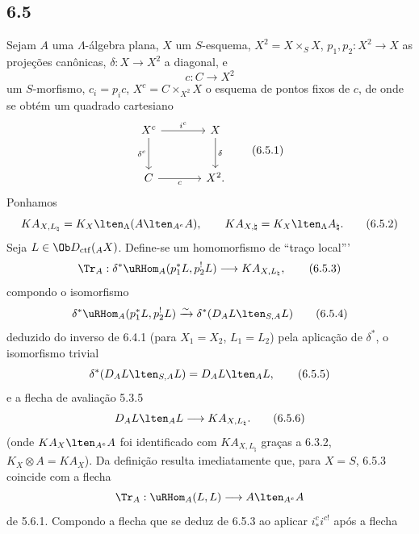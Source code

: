 \subsection*{6.5}
Sejam $A$ uma $\Lambda$-álgebra plana, $X$ um $S$-esquema, $X^2=X\times_SX$, $p_1,p_2:X^2\to X$ as projeções canônicas, $\delta:X\to X^2$ a diagonal, e
\[
c:C\longrightarrow X^2
\]
um $S$-morfismo, $c_i=p_ic$, $X^c=C\times_{X^2}X$ o esquema de pontos fixos de $c$, de onde se obtém um quadrado cartesiano
\begin{equation}
\begin{tikzcd}[column sep=large,row sep=large]
X^c \arrow[r,"i^c"] \arrow[d,"\delta^c"'] & X \arrow[d,"\delta"]\\
C \arrow[r,"c"'] & X^2 .
\end{tikzcd}
\tag{6.5.1}
\end{equation}
Ponhamos
\begin{equation}
KA_{X,L_{\natural}}=K_X\lten_{\Lambda}(A\lten_{A^e}A),
\qquad
KA_{X,\natural}=K_X\lten_{\Lambda}A_{\natural}.
\tag{6.5.2}
\end{equation}
Seja $L\in\Ob D_{\mathrm{ctf}}({}_AX)$. Define-se um homomorfismo de ``traço local'''
\begin{equation}
\Tr_A:\delta^*\uRHom_A(p_1^*L,p_2^!L)
\longrightarrow
KA_{X,L_{\natural}},
\tag{6.5.3}
\end{equation}
compondo o isomorfismo
\begin{equation}
\delta^*\uRHom_A(p_1^*L,p_2^!L)
\xrightarrow{\sim}
\delta^*(D_AL\lten_{S,A}L)
\tag{6.5.4}
\end{equation}
deduzido do inverso de 6.4.1 (para $X_1=X_2$, $L_1=L_2$) pela aplicação de $\delta^*$, o isomorfismo trivial
\begin{equation}
\delta^*(D_AL\lten_{S,A}L)=D_AL\lten_AL,
\tag{6.5.5}
\end{equation}
e a flecha de avaliação 5.3.5
\begin{equation}
D_AL\lten_AL\longrightarrow KA_{X,L_{\natural}}.
\tag{6.5.6}
\end{equation}
(onde $KA_X\lten_{A^e}A$ foi identificado com $KA_{X,L_{\natural}}$ graças a 6.3.2, $K_X\otimes A=KA_X$). Da definição resulta imediatamente que, para $X=S$, 6.5.3 coincide com a flecha
\[
\Tr_A:\uRHom_A(L,L)\longrightarrow A\lten_{A^e}A
\]
de 5.6.1. Compondo a flecha que se deduz de 6.5.3 ao aplicar $i_*^ci^{c!}$ após a flecha
